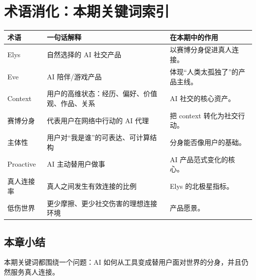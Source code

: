 \section{术语消化：本期关键词索引}

\begin{longtable}{p{}p{}p{}}
\toprule
术语 & 一句话解释 & 在本期中的作用 \\
\midrule
Elys & 自然选择的 AI 社交产品 & 以赛博分身促进真人连接。 \\
Eve & AI 陪伴/游戏产品 & 体现“人类太孤独了”的产品主线。 \\
Context & 用户的高维状态：经历、偏好、价值观、作品、关系 & AI 社交的核心资产。 \\
赛博分身 & 代表用户在网络中行动的 AI 代理 & 把 context 转化为社交行动。 \\
主体性 & 用户对“我是谁”的可表达、可计算结构 & 分身能否像用户的基础。 \\
Proactive & AI 主动替用户做事 & AI 产品范式变化的核心。 \\
真人连接率 & 真人之间发生有效连接的比例 & Elys 的北极星指标。 \\
低伤世界 & 更少摩擦、更少社交伤害的理想连接环境 & 产品愿景。 \\
\bottomrule
\end{longtable}

\subsection{本章小结}

本期关键词都围绕一个问题：AI 如何从工具变成替用户面对世界的分身，并且仍然服务真人连接。

